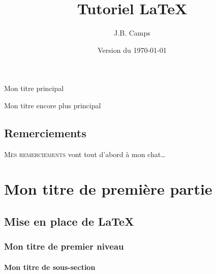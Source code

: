 \documentclass[12pt,a4paper]{book} %
\author{J.B. Camps}
\title{Tutoriel \LaTeX{}}
\date{Version du \today}
\begin{document}
\frontmatter


\begin{titlepage}

\begin{center}
\begin{large}
Mon titre principal
\end{large}
\end{center}

\bigskip
\bigskip

\begin{Huge}
Mon titre encore plus principal
\end{Huge}


\end{titlepage}



\chapter*{Remerciements}

\lettrine{M}{es remerciements} vont tout d'abord à mon chat\dots

\mainmatter

\part{Mon titre de première partie}

\chapter{Mise en place de \LaTeX{}}

\section{Mon titre de premier niveau}

\subsection{Mon titre de sous-section}
\end{document}
